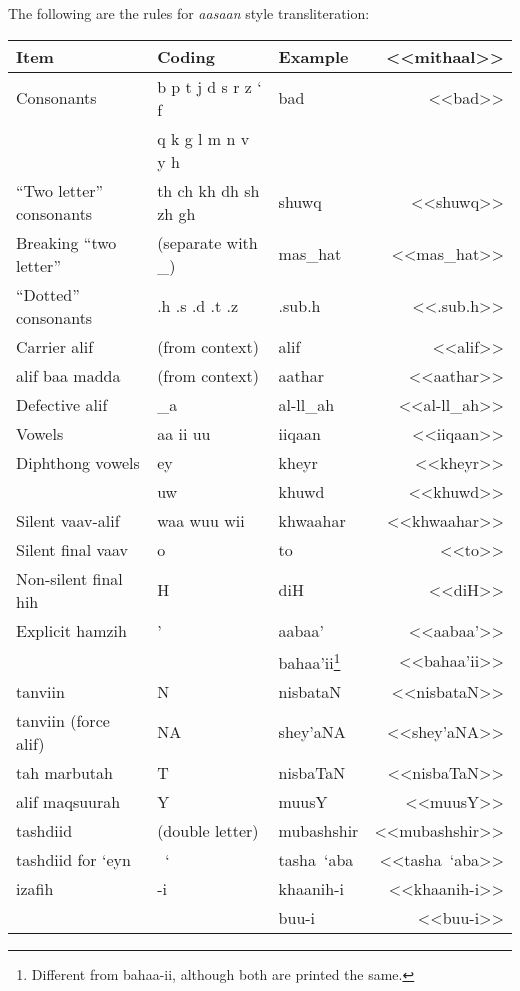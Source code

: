 \documentclass[12pt]{article}
\begin{document}
The following are the rules for \emph{aasaan} style transliteration:

\setfarsi
\newtanwin

\begin{longtable}{lllr}
  \textbf{Item} & \textbf{Coding} & \textbf{Example} & <<mithaal>> \\ \hline
  Consonants & b p t j d s r z ` f & bad & <<bad>> \\
             & q k g l m n v y h & & \\
  ``Two letter'' consonants & th ch kh dh sh zh gh & shuwq & <<shuwq>> \\
  Breaking ``two letter'' & (separate with \_) & mas\_hat & <<mas_hat>> \\
  ``Dotted'' consonants & .h .s .d .t .z & .sub.h & <<.sub.h>> \\
  Carrier alif & (from context) & alif & <<alif>> \\
  alif baa madda & (from context) & aathar & <<aathar>> \\
  Defective alif & \_a & al-ll\_ah & <<al-ll_ah>> \\
  Vowels & aa ii uu & iiqaan & <<iiqaan>> \\
  Diphthong vowels & ey & kheyr & <<kheyr>> \\
                   & uw & khuwd & <<khuwd>> \\
  Silent vaav-alif & waa wuu wii & khwaahar & <<khwaahar>> \\
  Silent final vaav & o & to & <<to>> \\
  Non-silent final hih & H & diH & <<diH>> \\
  Explicit hamzih & ' & aabaa' & <<aabaa'>> \\
                  &   & bahaa'ii\footnote{Different from bahaa-ii, although both are printed the same.} & <<bahaa'ii>> \\
  tanviin & N & nisbataN & <<nisbataN>> \\
  tanviin (force alif) & NA & shey'aNA & <<shey'aNA>> \\
  tah marbutah & T & nisbaTaN & <<nisbaTaN>> \\
  alif maqsuurah & Y & muusY & <<muusY>> \\
  tashdiid & (double letter) & mubashshir & <<mubashshir>> \\
  tashdiid for `eyn & ~` & tasha~`aba & <<tasha~`aba>> \\
  izafih & -i & khaanih-i & <<khaanih-i>> \\
         &    & buu-i & <<buu-i>> \\

\end{longtable}
\end{document}

